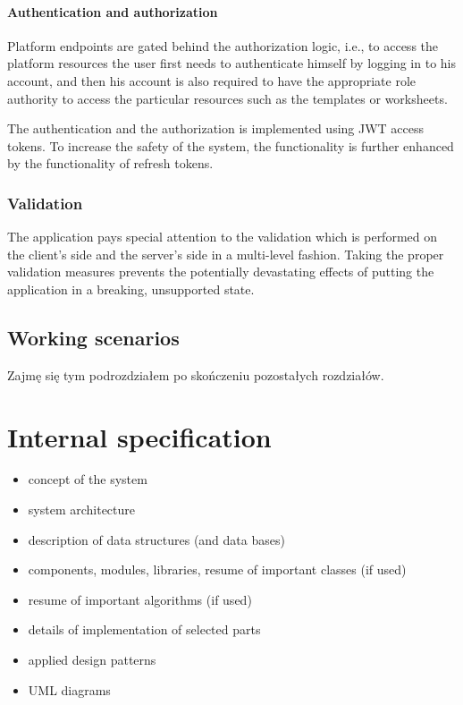 \documentclass[a4paper,twoside,12pt]{book}
\begin{document}
\subsubsection{Authentication and authorization}
Platform endpoints are gated behind the authorization logic, i.e., to access the platform resources the user first needs to authenticate himself by logging in to his account, and then his account is also required to have the appropriate role authority to access the particular resources such as the templates or worksheets.

The authentication and the authorization is implemented using JWT access tokens. To increase the safety of the system, the functionality is further enhanced by the functionality of refresh tokens.

\subsection{Validation}
The application pays special attention to the validation which is performed on the client's side and the server's side in a multi-level fashion. Taking the proper validation measures prevents the potentially devastating effects of putting the application in a breaking, unsupported state.


\section{Working scenarios}

\color{blue}
Zajmę się tym podrozdziałem po skończeniu pozostałych rozdziałów.
\color{black}

\chapter{Internal specification}

\begin{itemize}
\item concept of the system
\item system architecture
\item description of data structures (and data bases)
\item components, modules, libraries, resume of important classes (if used)
\item resume of important algorithms (if used)
\item details of implementation of selected parts
\item applied design patterns
\item UML diagrams
\end{itemize}
\end{document}
